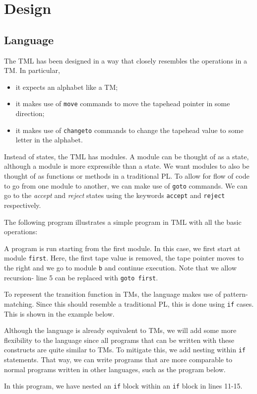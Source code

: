 \chapter{Design}
\section{Language}

The TML has been designed in a way that closely resembles the operations in a TM. In particular, 
\begin{itemize}
    \item it expects an alphabet like a TM;
    \item it makes use of \texttt{move} commands to move the tapehead pointer in some direction;
    \item it makes use of \texttt{changeto} commands to change the tapehead value to some letter in the alphabet.
\end{itemize}
Instead of states, the TML has modules. A module can be thought of as a state, although a module is more expressible than a state. We want modules to also be thought of as functions or methods in a traditional PL. To allow for flow of code to go from one module to another, we can make use of \texttt{goto} commands. We can go to the \textit{accept} and \textit{reject} states using the keywords \texttt{accept} and \texttt{reject} respectively.

The following program illustrates a simple program in TML with all the basic operations:

A program is run starting from the first module. In this case, we first start at module \texttt{first}. Here, the first tape value is removed, the tape pointer moves to the right and we go to module \texttt{b} and continue execution. Note that we allow recursion- line 5 can be replaced with \texttt{goto first}.

To represent the transition function in TMs, the language makes use of pattern-matching. Since this should resemble a traditional PL, this is done using \texttt{if} cases. This is shown in the example below.


Although the language is already equivalent to TMs, we will add some more flexibility to the language since all programs that can be written with these constructs are quite similar to TMs. To mitigate this, we add nesting within \texttt{if} statements. That way, we can write programs that are more comparable to normal programs written in other languages, such as the program below.

In this program, we have nested an \texttt{if} block within an \texttt{if} block in lines 11-15.

